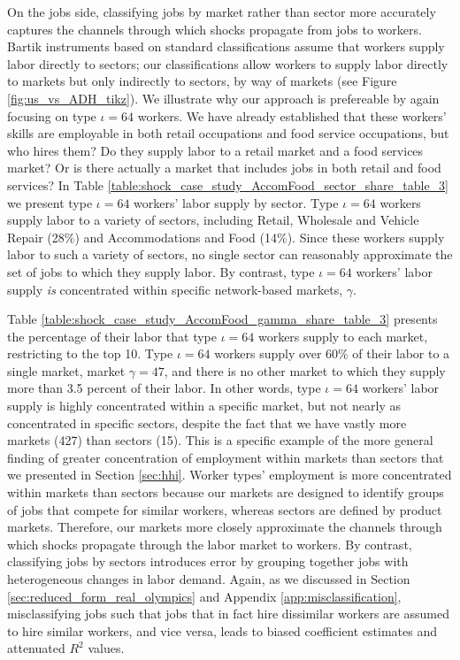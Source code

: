 \documentclass[12pt]{article}
\def\g{\gamma}
\def\i{\iota}
\theoremstyle{definition}
\theoremstyle{plain}
\begin{document}



On the jobs side, classifying jobs by market rather than sector more accurately captures the channels through which shocks propagate from jobs to workers. Bartik instruments based on standard classifications assume that workers supply labor directly to sectors; our classifications allow workers to supply labor directly to markets but only indirectly to sectors, by way of markets (see Figure \ref{fig:us_vs_ADH_tikz}). We illustrate why our approach is prefereable by again focusing on type $\i=64$ workers. We have already established that these workers' skills are employable in both retail occupations and food service occupations, but who hires them? Do they supply labor to a retail market and a food services market? Or is there actually a market that includes jobs in both retail and food services? In Table \ref{table:shock_case_study_AccomFood_sector_share_table_3} we present type $\i=64$ workers' labor supply by sector. Type $\i=64$ workers supply labor to a variety of sectors, including Retail, Wholesale and Vehicle Repair (28\%) and Accommodations and Food (14\%). Since these workers supply labor to such a  variety of sectors, no single sector can reasonably approximate the set of jobs to which they supply labor. By contrast, type $\i=64$ workers' labor supply \emph{is} concentrated within specific network-based markets, $\g$. 


Table \ref{table:shock_case_study_AccomFood_gamma_share_table_3} presents the percentage of their labor that type $\i=64$ workers supply to each market, restricting to the top 10. Type $\i=64$ workers supply over 60\% of their labor to a single market, market $\g=47$, and there is no other market to which they supply more than 3.5 percent of their labor. In other words, type $\i=64$ workers' labor supply is highly concentrated within a specific market, but not nearly as concentrated in specific sectors, despite the fact that we have vastly more markets (427) than sectors (15).  This is a specific example of the more general finding of greater concentration of employment within markets than sectors that we presented in Section \ref{sec:hhi}. Worker types' employment is more concentrated within markets than sectors because our markets are designed to identify groups of jobs that compete for similar workers, whereas sectors are defined by product markets. Therefore, our markets more closely approximate the channels through which shocks propagate through the labor market to workers. By contrast, classifying jobs by sectors introduces error by grouping together jobs with heterogeneous changes in labor demand.  Again, as we discussed in Section \ref{sec:reduced_form_real_olympics} and Appendix \ref{app:misclassification}, misclassifying jobs such that jobs that in fact hire dissimilar workers are assumed to hire similar workers, and vice versa, leads to biased coefficient estimates and attenuated $R^2$ values.
\end{document}
